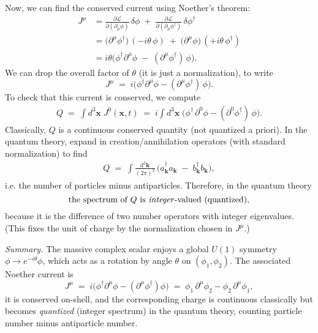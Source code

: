 \documentclass[12pt]{article}
\newcommand{\del}{\partial}
\begin{document}
Now, we can find the conserved current using Noether's theorem:
\begin{align*}
   J^\mu
   &= \frac{\partial \mathcal{L}}{\partial(\del_\mu \phi)}\,\delta\phi
     \;+\; \frac{\partial \mathcal{L}}{\partial(\del_\mu \phi^\dagger)}\,\delta\phi^\dagger \\
   &= \big(\del^\mu\phi^\dagger\big)\,(-i\theta\,\phi)
     \;+\; \big(\del^\mu\phi\big)\,(+i\theta\,\phi^\dagger) \\
   &= i\theta\Big(\phi^\dagger \del^\mu \phi \;-\; (\del^\mu\phi^\dagger)\,\phi\Big).
\end{align*}
We can drop the overall factor of $\theta$ (it is just a normalization), to write
\begin{equation*}
   J^\mu \;=\; i\Big(\phi^\dagger \del^\mu \phi - (\del^\mu\phi^\dagger)\,\phi\Big).
\end{equation*}
To check that this current is conserved, we compute
\begin{align*}
   Q \;=\; \int d^3\mathbf{x}\; J^0(\mathbf{x},t)
   \;=\; i\int d^3\mathbf{x}\;\Big(\phi^\dagger\,\del^0\phi - (\del^0\phi^\dagger)\,\phi\Big).
\end{align*}
Classically, $Q$ is a continuous conserved quantity (not quantized a priori).
In the quantum theory, expand in creation/annihilation operators (with standard normalization) to find
\begin{align*}
   Q \;=\; \int \frac{d^3\mathbf{k}}{(2\pi)^3}\,
        \Big(a_{\mathbf{k}}^\dagger a_{\mathbf{k}} \;-\; b_{\mathbf{k}}^\dagger b_{\mathbf{k}}\Big),
\end{align*}
i.e. the number of particles minus antiparticles. Therefore, in the quantum theory
\begin{equation*}
   \text{the spectrum of } Q \text{ is \emph{integer}-valued (quantized),}
\end{equation*}
because it is the difference of two number operators with integer eigenvalues. (This fixes the unit of charge by the normalization chosen in $J^\mu$.)

\textit{Summary.}
The massive complex scalar enjoys a global $U(1)$ symmetry $\phi\to e^{-i\theta}\phi$,
which acts as a rotation by angle $\theta$ on $(\phi_1,\phi_2)$. The associated Noether
current is
\begin{equation*}
   J^\mu \;=\; i\big(\phi^\dagger \del^\mu \phi - (\del^\mu\phi^\dagger)\phi\big)
   \;=\; \phi_1\,\del^\mu\phi_2 - \phi_2\,\del^\mu\phi_1,
\end{equation*}
it is conserved on-shell, and the corresponding charge is continuous classically but becomes
\emph{quantized} (integer spectrum) in the quantum theory, counting particle number minus antiparticle number.
\end{document}
